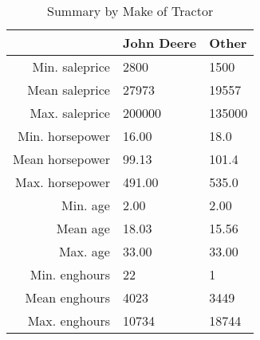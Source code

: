 \begin{table}[ht]
\centering
\begin{tabular}{rll}
  \hline
 & John Deere & Other \\ 
  \hline
Min. saleprice &   2800 &   1500 \\ 
  Mean saleprice &  27973 &  19557 \\ 
  Max. saleprice & 200000 & 135000 \\ 
  Min. horsepower &  16.00 &  18.0 \\ 
  Mean horsepower &  99.13 & 101.4 \\ 
  Max. horsepower & 491.00 & 535.0 \\ 
  Min. age &  2.00 &  2.00 \\ 
  Mean age & 18.03 & 15.56 \\ 
  Max. age & 33.00 & 33.00 \\ 
  Min. enghours &    22 &     1 \\ 
  Mean enghours &  4023 &  3449 \\ 
  Max. enghours & 10734 & 18744 \\ 
   \hline
\end{tabular}
\caption{Summary by Make of Tractor} 
\label{tab:summ_by_make}
\end{table}
